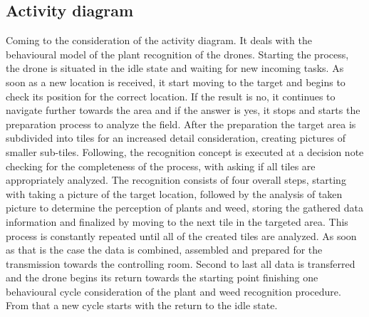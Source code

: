 \documentclass[english]{lni}
\begin{document}
\subsection{Activity diagram}
Coming to the consideration of the activity diagram. It deals with the behavioural model of the plant recognition of the drones. Starting the process, the drone is situated in the idle state and waiting for new incoming tasks. As soon as a new location is received, it start moving to the target and begins to check its position for the correct location. If the result is no, it continues to navigate further towards the area and if the answer is yes, it stops and starts the preparation process to analyze the field. After the preparation the target area is subdivided into tiles for an increased detail consideration, creating pictures of smaller sub-tiles. Following, the recognition concept is executed at a decision note checking for the completeness of the process, with asking if all tiles are appropriately analyzed. The recognition consists of four overall steps, starting with taking a picture of the target location, followed by the analysis of taken picture to determine the perception of plants and weed, storing the gathered data information and finalized by moving to the next tile in the targeted area. This process is constantly repeated until all of the created tiles are analyzed. As soon as that is the case the data is combined, assembled and prepared for the transmission towards the controlling room. Second to last all data is transferred and the drone begins its return towards the starting point finishing one behavioural cycle consideration of the plant and weed recognition procedure. From that a new cycle starts with the return to the idle state.
\end{document}
